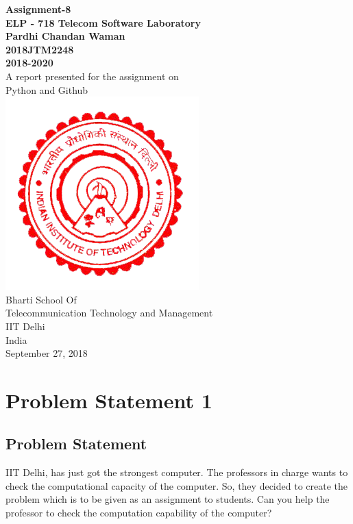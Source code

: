 \documentclass[a4paper,12pt]{article}
\begin{document}
	\begin{center}
		\textbf{Assignment-8 \\
			\bigskip
			ELP - 718 Telecom Software Laboratory \\
			\smallskip
			Pardhi Chandan Waman \\
			2018JTM2248 \\
			2018-2020} \\
		\vspace{10mm}
		A report presented for the assignment on \\
		Python and Github \\
		\vspace{30mm}
		\includegraphics[scale=0.5]{logo} \\
		\vspace{10mm}
		Bharti School Of \\
		Telecommunication Technology and Management \\
		IIT Delhi \\
		India \\
		September 27, 2018
	\end{center}
	\newpage
	\tableofcontents
	\newpage
	\listoffigures
	\newpage
	
	
	\section{Problem Statement 1}
	\subsection{Problem Statement}
	IIT Delhi, has just got the strongest computer. The professors in charge wants to check the computational capacity of the computer. So, they decided to create the problem which is to be given as an assignment to students. Can you help the professor to check the computation capability of the computer?\\
	
\end{document}
